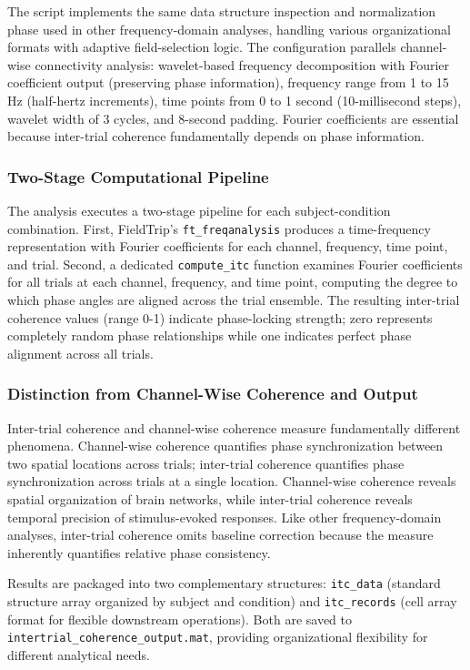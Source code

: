 \documentclass[12pt]{report}
\begin{document}
The script implements the same data structure inspection and normalization phase used in other frequency-domain analyses, handling various organizational formats with adaptive field-selection logic. The configuration parallels channel-wise connectivity analysis: wavelet-based frequency decomposition with Fourier coefficient output (preserving phase information), frequency range from 1 to 15 Hz (half-hertz increments), time points from 0 to 1 second (10-millisecond steps), wavelet width of 3 cycles, and 8-second padding. Fourier coefficients are essential because inter-trial coherence fundamentally depends on phase information.

\subsubsection{Two-Stage Computational Pipeline}

The analysis executes a two-stage pipeline for each subject-condition combination. First, FieldTrip's \verb|ft_freqanalysis| produces a time-frequency representation with Fourier coefficients for each channel, frequency, time point, and trial. Second, a dedicated \verb|compute_itc| function examines Fourier coefficients for all trials at each channel, frequency, and time point, computing the degree to which phase angles are aligned across the trial ensemble. The resulting inter-trial coherence values (range 0-1) indicate phase-locking strength; zero represents completely random phase relationships while one indicates perfect phase alignment across all trials.

\subsubsection{Distinction from Channel-Wise Coherence and Output}

Inter-trial coherence and channel-wise coherence measure fundamentally different phenomena. Channel-wise coherence quantifies phase synchronization between two spatial locations across trials; inter-trial coherence quantifies phase synchronization across trials at a single location. Channel-wise coherence reveals spatial organization of brain networks, while inter-trial coherence reveals temporal precision of stimulus-evoked responses. Like other frequency-domain analyses, inter-trial coherence omits baseline correction because the measure inherently quantifies relative phase consistency.

Results are packaged into two complementary structures: \verb|itc_data| (standard structure array organized by subject and condition) and \verb|itc_records| (cell array format for flexible downstream operations). Both are saved to \verb|intertrial_coherence_output.mat|, providing organizational flexibility for different analytical needs.
\end{document}
